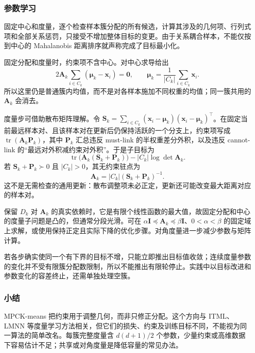 \subsubsection{参数学习}

固定中心和度量，逐个检查样本簇分配的所有候选，计算其涉及的几何项、行列式项和全部关系惩罚，只接受不增加整体目标的变更。由于关系耦合样本，不能仅按到中心的 Mahalanobis 距离排序就声称完成了目标最小化。

固定分配和度量时，约束项不含中心。对中心求导给出
\[
 2\bm{A}_k\sum_{i\in C_k}(\bm{\mu}_k-\bm{x}_i)=\bm{0},
 \qquad
 \bm{\mu}_k=\frac{1}{|C_k|}\sum_{i\in C_k}\bm{x}_i.
\]
所以这里仍是普通簇内均值，而不是对各样本施加不同权重的均值；同一簇共用的 $\bm{A}_k$ 会消去。

度量步可借助散布矩阵理解。令 $\bm{S}_k=\sum_{i\in C_k}(\bm{x}_i-\bm{\mu}_k)(\bm{x}_i-\bm{\mu}_k)^\top$。在固定当前最远样本对、且该样本对在更新后仍保持活跃的一个分支上，约束项写成 $\operatorname{tr}(\bm{A}_k\bm{P}_k)$，其中 $\bm{P}_k$ 汇总违反 must-link 的半权重差分外积，以及违反 cannot-link 的“最远对外积减约束对外积”。于是子目标为
\[
 \operatorname{tr}\bigl(\bm{A}_k(\bm{S}_k+\bm{P}_k)\bigr)
 -|C_k|\log\det\bm{A}_k.
\]
若 $\bm{S}_k+\bm{P}_k\succ0$ 且 $|C_k|>0$，其无约束驻点为
\begin{equation}
 \bm{A}_k=|C_k|(\bm{S}_k+\bm{P}_k)^{-1}.
 \label{eq:clustering-mpck-metric}
\end{equation}
这不是无需检查的通用更新：散布调整项未必正定，更新还可能改变最大距离对应的样本对。

保留 $D_k$ 对 $\bm{A}_k$ 的真实依赖时，它是有限个线性函数的最大值，故固定分配和中心的度量子问题是凸的，但通常分段光滑。可在 $\alpha\bm{I}\preceq\bm{A}_k\preceq\beta\bm{I}$、$0<\alpha<\beta$ 的固定域上求解，或使用保持正定且实际下降的优化步骤。对角度量进一步减少参数与矩阵计算。

若各步确实使同一个有下界的目标不增，只能立即推出目标值收敛；连续度量参数的变化并不受有限簇分配数限制，所以不能推出有限轮停止。实践中以目标改进和参数变化的容差终止，还需单独处理空簇。

\subsubsection{小结}

MPCK-means 把约束用于调整几何，而非只修正分配。这个方向与 ITML、LMNN 等度量学习方法相关，但它们的损失、约束及训练目标不同，不能视为同一算法的简单改名。每簇完整度量含 $d(d+1)/2$ 个参数，少量约束或高维数据下容易估计不足；共享或对角度量是降低容量的常见办法。

